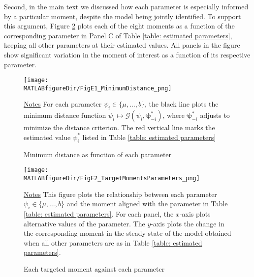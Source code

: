 Second, in the main text we discussed how each parameter is especially informed by a particular moment, despite the model being jointly identified. To support this argument, Figure \ref{figure: identification_local} plots each of the eight moments as a function of the corresponding parameter in Panel C of Table \ref{table: estimated parameters}, keeping all other parameters at their estimated values. All panels in the figure show significant variation in the moment of interest as a function of its respective parameter.

\begin{figure}[h!]
\begin{center}
\texttt{[image: \\MATLABfigureDir/FigE1\_MinimumDistance\_png]}
\caption{Minimum distance as function of each parameter}\label{figure: identification_global}\vspace*{-0.3cm}
\end{center}
{
\footnotesize \underline{Notes}
For each parameter $\psi_i\in\{\mu,\dots,b\}$, the black line plots the minimum distance function $\psi_i \mapsto \mathcal{G}(\psi_i,\bm{\psi}_{-i}^*)$, where $\pmb{\psi}_{-i}^*$ adjusts to minimize the distance criterion.
The red vertical line marks the estimated value $\psi_i^\ast$ listed in Table \ref{table: estimated parameters}
}\vspace*{.75cm}
\end{figure}

\begin{figure}[h!]
\begin{center}
\hspace*{-.85cm}
\texttt{[image: \\MATLABfigureDir/FigE2\_TargetMomentsParameters\_png]}
\caption{Each targeted moment against each parameter}\label{figure: identification_local}\vspace*{-0.3cm}
\end{center}
{\footnotesize \underline{Notes}
This figure plots the relationship between each parameter $\psi_i\in \{\mu,\dots,b\}$ and the moment aligned with the
parameter in Table \ref{table: estimated parameters}.
For each panel, the $x$-axis plots alternative values of the parameter.
The $y$-axis plots the change in the corresponding moment in the steady state of the model obtained when all other parameters are as in Table  \ref{table: estimated parameters}.
}
\end{figure}



